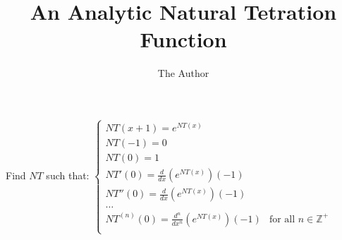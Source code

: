 \documentclass[11pt, oneside]{article}   	%
\title{An Analytic Natural Tetration Function}
\author{The Author}
\begin{document}
\maketitle

Find $NT$ such that:
$\begin{cases}
NT(x+1) = e^{NT(x)}\\
NT(-1) = 0\\
NT(0) = 1\\
NT'(0) = \frac{d}{dx}({e^{NT(x)}})(-1)\\
NT''(0) = \frac{d}{dx}({e^{NT(x)}})(-1)\\
\dots\\
NT^{(n)}(0) = \frac{d^n}{dx^n}({e^{NT(x)}})(-1)& \text{for all $n \in \mathbb{Z}^+$}\\
\end{cases}$
\end{document}
